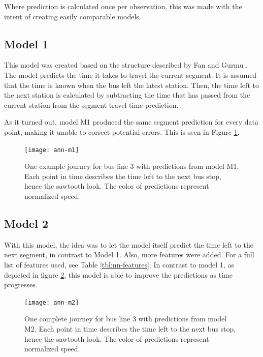 Where prediction is calculated once per observation, this was made with the intent of creating easily comparable models.

\subsection{Model 1}
This model was created based on the structure described by Fan and Gurmu \cite{brazilANN}. The model predicts the time it takes to travel the current segment. It is assumed that the time is known when the bus left the latest station. Then, the time left to the next station is calculated by subtracting the time that has passed from the current station from the segment travel time prediction.

As it turned out, model M1 produced the same segment prediction for every data point, making it unable to correct potential errors. This is seen in Figure \ref{fig:ann-m1}.


\begin{figure}[h]
	\begin{minipage}{\textwidth}
		\begin{adjustbox}{center}
			\texttt{[image: ann-m1]}
		\end{adjustbox}  
		\caption{One example journey for bus line 3 with predictions from model M1. Each point in time describes the time left to the next bus stop, hence the sawtooth look. The color of predictions represent normalized speed.}
		\label{fig:ann-m1}      
	\end{minipage}
\end{figure}


\subsection{Model 2}\label{M2}
With this model, the idea was to let the model itself predict the time left to the next segment, in contrast to Model 1. Also, more features were added. For a full list of features used, see Table \ref{tbl:nn-features}. In contrast to model 1, as depicted in figure \ref{fig:ann-m2}, this model is able to improve the predictions as time progresses.


\begin{figure}[h]
	\begin{minipage}{\textwidth}
		\begin{adjustbox}{center}
			\texttt{[image: ann-m2]}
		\end{adjustbox}  
		\caption{One complete journey for bus line 3 with predictions from model M2. Each point in time describes the time left to the next bus stop, hence the sawtooth look. The color of predictions represent normalized speed.}
		\label{fig:ann-m2}      
	\end{minipage}
\end{figure}

